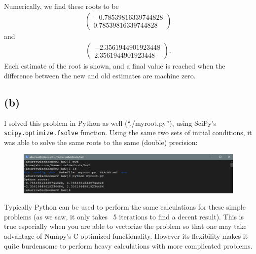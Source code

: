\documentclass[12pt]{article}
\begin{document}
Numerically, we find these roots to be
$$
\begin{aligned}
\begin{pmatrix}
-0.78539816339744828 \\ 0.78539816339744828
\end{pmatrix}
\end{aligned}
$$
and
$$
\begin{aligned}
\begin{pmatrix}
-2.3561944901923448 \\ 2.3561944901923448
\end{pmatrix}.
\end{aligned}
$$
Each estimate of the root is shown, and a final value is reached when the
difference between the new and old estimates are machine zero.

\subsection*{(b)}

I solved this problem in Python as well (``./myroot.py''), using SciPy's
\texttt{scipy.optimize.fsolve} function. Using the same two sets of initial
conditions, it was able to solve the same roots to the same (double) precision:
\begin{figure}[H]
    \centering
    \includegraphics[width=1.0\textwidth]{python}
    \label{fig:python}
\end{figure}

Typically Python can be used to perform the same calculations for these simple
problems (as we saw, it only takes ~5 iterations to find a decent result). This
is true especially when you are able to vectorize the problem so that one may
take advantage of Numpy's C-optimized functionality. However its flexibility
makes it quite burdensome to perform heavy calculations with more complicated
problems.
\end{document}
